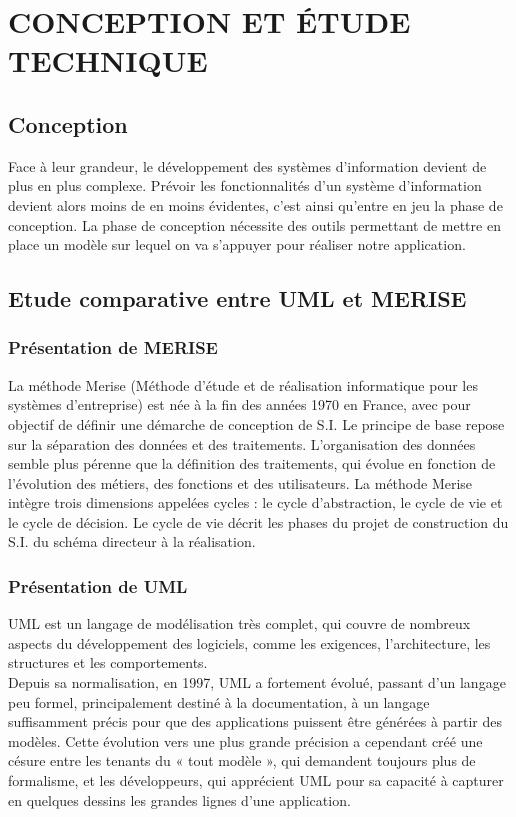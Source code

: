 \chapter{CONCEPTION ET ÉTUDE TECHNIQUE}
	\section{Conception}
	
	Face à leur grandeur, le développement des systèmes d'information devient de plus en plus complexe. Prévoir les fonctionnalités d'un système d'information devient alors moins de en moins évidentes, c'est ainsi qu'entre en jeu la phase de conception. La phase de conception nécessite des outils permettant de mettre en place un modèle sur lequel on va s'appuyer pour réaliser notre application.
	
	\section{Etude comparative entre UML et MERISE}
	\subsection{Présentation de MERISE}
		La méthode Merise (Méthode d'étude et de réalisation informatique pour les systèmes d'entreprise) est née à la fin des années 1970 en France, avec pour objectif de définir une démarche de conception de S.I. Le principe de base repose sur la séparation des données et des traitements. L'organisation des données semble plus pérenne que la définition des traitements, qui évolue en fonction de l'évolution des métiers, des fonctions et des utilisateurs.	
		La méthode Merise intègre trois dimensions appelées cycles : le cycle d'abstraction, le cycle de vie et le cycle de décision. Le cycle de vie décrit les phases du projet de construction du S.I. du schéma directeur à la réalisation.\cite{definition_merise}
		
	\subsection{Présentation de UML}
			UML est un langage de modélisation très complet, qui couvre de nombreux aspects du développement des logiciels, comme les exigences, l’architecture, les structures et les comportements.\\
			
			Depuis sa normalisation, en 1997, UML a fortement évolué, passant d’un langage peu formel, principalement destiné à la documentation, à un langage suffisamment précis pour que des applications puissent être générées à partir des modèles. Cette évolution	vers une plus grande précision a cependant créé une césure entre les tenants du « tout modèle », qui demandent toujours plus de formalisme, et les développeurs, qui apprécient UML pour sa capacité à capturer en quelques dessins les grandes lignes d’une
			application.
